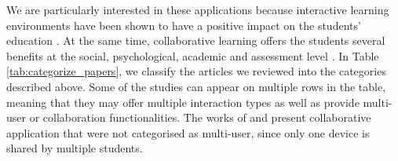 We are particularly interested in these applications because interactive learning environments have been shown to have a positive impact on the students' education \cite{johnson2000animated}. At the same time, collaborative learning offers the students several benefits at the social, psychological, academic and assessment level \cite{laal2012benefits}. In Table \ref{tab:categorize_papers}, we classify the \papersSelected articles we reviewed into the categories described above. Some of the studies can appear on multiple rows in the table, meaning that they may offer multiple interaction types as well as provide multi-user or collaboration functionalities. The works of \cite{tscholl2016designing} and \cite{ManriqueJuan2017APA} present collaborative application that were not categorised as multi-user, since only one device is shared by multiple students.

